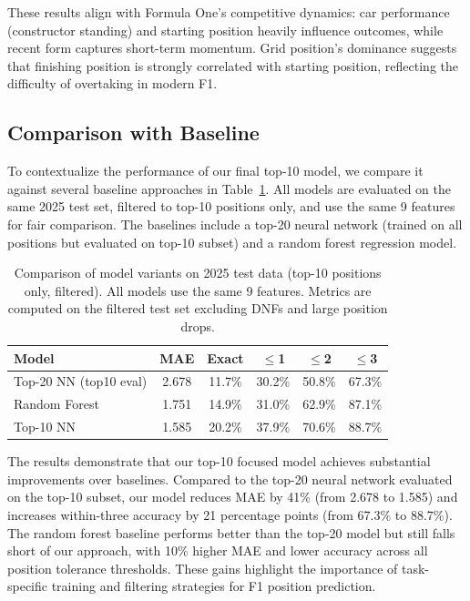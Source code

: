 \documentclass{article}
\begin{document}
These results align with Formula One's competitive dynamics: car performance (constructor standing) and starting position heavily influence outcomes, while recent form captures short-term momentum. Grid position's dominance suggests that finishing position is strongly correlated with starting position, reflecting the difficulty of overtaking in modern F1.


\subsection{Comparison with Baseline}

To contextualize the performance of our final top-10 model, we compare it against several baseline approaches in Table~\ref{tab:baseline-comparison}. All models are evaluated on the same 2025 test set, filtered to top-10 positions only, and use the same 9 features for fair comparison. The baselines include a top-20 neural network (trained on all positions but evaluated on top-10 subset) and a random forest regression model.

\begin{table}[t]
  \centering
  \caption{Comparison of model variants on 2025 test data (top-10 positions only, filtered). All models use the same 9 features. Metrics are computed on the filtered test set excluding DNFs and large position drops.}
  \label{tab:baseline-comparison}
  \begin{tabular}{lccccc}
    \toprule
    Model & MAE & Exact & $\leq$1 & $\leq$2 & $\leq$3 \\
    \midrule
    Top-20 NN (top10 eval)  & 2.678 & 11.7\% & 30.2\% & 50.8\% & 67.3\% \\
    Random Forest            & 1.751 & 14.9\% & 31.0\% & 62.9\% & 87.1\% \\
    Top-10 NN         & 1.585 & 20.2\% & 37.9\% & 70.6\% & 88.7\% \\
    \bottomrule
  \end{tabular}
\end{table}

The results demonstrate that our top-10 focused model achieves substantial improvements over baselines. Compared to the top-20 neural network evaluated on the top-10 subset, our model reduces MAE by 41\% (from 2.678 to 1.585) and increases within-three accuracy by 21 percentage points (from 67.3\% to 88.7\%). The random forest baseline performs better than the top-20 model but still falls short of our approach, with 10\% higher MAE and lower accuracy across all position tolerance thresholds. These gains highlight the importance of task-specific training and filtering strategies for F1 position prediction.
\end{document}

